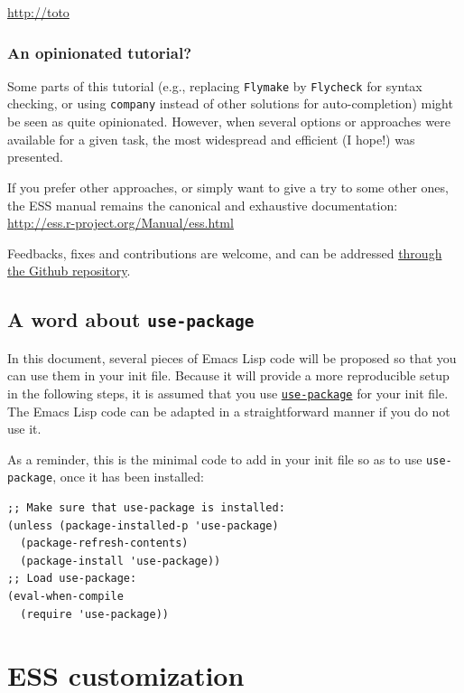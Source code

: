 \documentclass[11pt]{article}
\begin{document}
\begin{center}
\url{http://toto}
\end{center}


\subsubsection{An opinionated tutorial?}
\label{sec:orgfe0e2c5}
Some parts of this tutorial (e.g., replacing \texttt{Flymake} by \texttt{Flycheck} for syntax checking, or using \texttt{company} instead of other solutions for auto-completion) might be seen as quite opinionated. However, when several options or approaches were available for a given task, the most widespread and efficient (I hope!) was presented.

If you prefer other approaches, or simply want to give a try to some other ones, the ESS manual remains the canonical and exhaustive documentation: \url{http://ess.r-project.org/Manual/ess.html}

Feedbacks, fixes and contributions are welcome, and can be addressed \href{https://github.com/ess-intro/presentation-ess-customization/issues}{through the Github repository}.

\subsection{A word about \texttt{use-package}}
\label{sec:org60320fa}
In this document, several pieces of Emacs Lisp code will be proposed so that you can use them in your init file. Because it will provide a more reproducible setup in the following steps, it is assumed that you use \href{https://jwiegley.github.io/use-package/}{\texttt{use-package}} for your init file. The Emacs Lisp code can be adapted in a straightforward manner if you do not use it.

As a reminder, this is the minimal code to add in your init file so as to use \texttt{use-package}, once it has been installed:

\begin{verbatim}
;; Make sure that use-package is installed:
(unless (package-installed-p 'use-package)
  (package-refresh-contents)
  (package-install 'use-package))
;; Load use-package:
(eval-when-compile
  (require 'use-package))
\end{verbatim}

\section{ESS customization}
\label{sec:org2dce92b}
\end{document}
